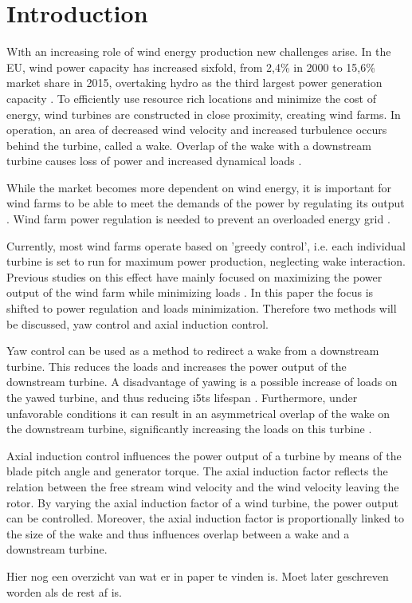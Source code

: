 \section{Introduction}
\lettrine[nindent=0em,lines=3]
With an increasing role of wind energy production new challenges arise\cite{Nat2016}. In the EU, wind power capacity has increased sixfold, from 2,4\% in 2000 to 15,6\% market share in 2015, overtaking hydro as the third largest power generation capacity \cite{EWEA2015}. To efficiently use resource rich locations and minimize the cost of energy, wind turbines are constructed in close proximity, creating wind farms. In operation, an area of decreased wind velocity and increased turbulence occurs behind the turbine, called a wake. Overlap of the wake with a downstream turbine causes loss of power and increased dynamical loads \cite{Boersma2017, Wilson2017, Dijk2016, Fleming2014, Zalkind2016}. 

While the market becomes more dependent on wind energy, it is important for wind farms to be able to meet the demands of the power by regulating its output \cite{Tande2003}. Wind farm power regulation is needed to prevent an overloaded energy grid \cite{Hansen2014}. 

Currently, most wind farms operate based on 'greedy control', i.e. each individual turbine is set to run for maximum power production, neglecting wake interaction. Previous studies on this effect have mainly focused on maximizing the power output of the wind farm while minimizing loads \cite{Dijk2016, vanDijk2016, Wilson2017}. In this paper the focus is shifted to power regulation and loads minimization. Therefore two methods will be discussed, yaw control and axial induction control. 

Yaw control can be used as a method to redirect a wake from a downstream turbine. This reduces the loads and increases the power output of the downstream turbine. A disadvantage of yawing is a possible increase of loads on the yawed turbine, and thus reducing i5ts lifespan \cite{Zalkind2016,Kanev2017}. Furthermore, under unfavorable conditions it can result in an asymmetrical overlap of the wake on the downstream turbine, significantly increasing the loads on this turbine \cite{Wilson2017,Dijk2016}. 

Axial induction control influences the power output of a turbine by means of the blade pitch angle and generator torque. The axial induction factor reflects the relation between the free stream wind velocity and the wind velocity leaving the rotor. By varying the axial induction factor of a wind turbine, the power output can be controlled. Moreover, the axial induction factor is proportionally linked to the size of the wake and thus influences overlap between a wake and a downstream turbine.  

Hier nog een overzicht van wat er in paper te vinden is. Moet later geschreven worden als de rest af is.
